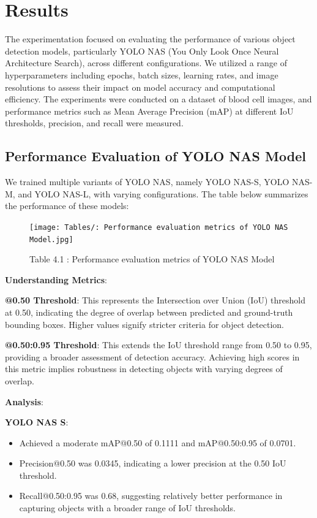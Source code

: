 \chapter{Results}
\label{ch:results}
The experimentation focused on evaluating the performance of various object detection models, particularly YOLO NAS (You Only Look Once Neural Architecture Search), across different configurations. We utilized a range of hyperparameters including epochs, batch sizes, learning rates, and image resolutions to assess their impact on model accuracy and computational efficiency. The experiments were conducted on a dataset of blood cell images, and performance metrics such as Mean Average Precision (mAP) at different IoU thresholds, precision, and recall were measured. 

 



\section{Performance Evaluation of YOLO NAS Model}

We trained multiple variants of YOLO NAS, namely YOLO NAS-S, YOLO NAS-M, and YOLO NAS-L, with varying configurations. The table below summarizes the performance of these models:

\begin{figure}[ht]
    \centering
    \texttt{[image: Tables/: Performance evaluation metrics of YOLO NAS Model.jpg]}
    \caption{Table 4.1 : Performance evaluation metrics of YOLO NAS Model}
    \label{fig:example-01}
\end{figure}
\clearpage
\textbf{Understanding Metrics}:

\textbf{@0.50 Threshold}: This represents the Intersection over Union (IoU) threshold at 0.50, indicating the degree of overlap between predicted and ground-truth bounding boxes. Higher values signify stricter criteria for object detection.

\textbf{@0.50:0.95 Threshold}: This extends the IoU threshold range from 0.50 to 0.95, providing a broader assessment of detection accuracy. Achieving high scores in this metric implies robustness in detecting objects with varying degrees of overlap.

\textbf{Analysis}:

\textbf{YOLO NAS S}:
\begin{itemize}
    \item Achieved a moderate mAP@0.50 of 0.1111 and mAP@0.50:0.95 of 0.0701.
    \item Precision@0.50 was 0.0345, indicating a lower precision at the 0.50 
IoU threshold.
    \item  Recall@0.50:0.95 was 0.68, suggesting relatively better performance in capturing objects with a broader range of IoU thresholds.
\end{itemize}

